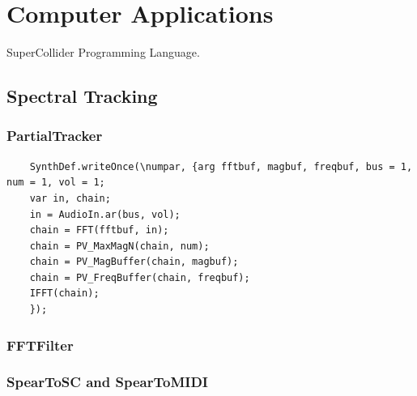 \chapter{Computer Applications}

SuperCollider Programming Language.

\section{Spectral Tracking}
\subsection{PartialTracker}

\begin{verbatim}
	SynthDef.writeOnce(\numpar, {arg fftbuf, magbuf, freqbuf, bus = 1, num = 1, vol = 1;
	var in, chain;
	in = AudioIn.ar(bus, vol);
	chain = FFT(fftbuf, in);
	chain = PV_MaxMagN(chain, num);
	chain = PV_MagBuffer(chain, magbuf);
	chain = PV_FreqBuffer(chain, freqbuf);
	IFFT(chain);
	});
\end{verbatim}

\subsection{FFTFilter}
\subsection{SpearToSC and SpearToMIDI}

